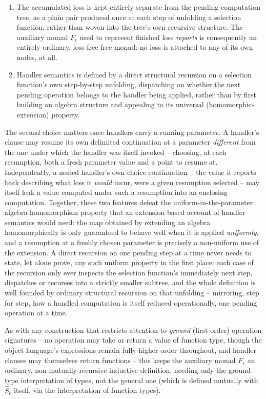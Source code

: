 \documentclass[11pt]{article}
\theoremstyle{plain}
\newcommand{\Fm}[1]{F_{#1}}
\newcommand{\Sm}[1]{\widehat{S}_{#1}}
\newcommand{\eps}{\epsilon}
\begin{document}
\begin{enumerate}
\item The accumulated loss is kept entirely separate from the pending-computation tree, as
  a plain pair produced once at each step of unfolding a selection function, rather than
  woven into the tree's own recursive structure. The auxiliary monad $\Fm\eps$ used to
  represent finished loss \emph{reports} is consequently an entirely ordinary, loss-free
  free monad: no loss is attached to any of its own nodes, at all.
\item Handler semantics is defined by a direct structural recursion on a selection
  function's own step-by-step unfolding, dispatching on whether the next pending operation
  belongs to the handler being applied, rather than by first building an algebra structure
  and appealing to its universal (homomorphic-extension) property.
\end{enumerate}

The second choice matters once handlers carry a running parameter. A handler's clause may
resume its own delimited continuation at a parameter \emph{different} from the one under
which the handler was itself invoked -- choosing, at each resumption, both a fresh
parameter value and a point to resume at. Independently, a nested handler's own choice
continuation -- the value it reports back describing what loss it \emph{would} incur, were
a given resumption selected -- may itself leak a value computed under such a resumption
into an enclosing computation. Together, these two features defeat the
uniform-in-the-parameter algebra-homomorphism property that an extension-based account of
handler semantics would need: the map obtained by extending an algebra homomorphically is
only guaranteed to behave well when it is applied \emph{uniformly}, and a resumption at a
freshly chosen parameter is precisely a non-uniform use of the extension. A direct
recursion on one pending step at a time never needs to state, let alone prove, any such
uniform property in the first place: each case of the recursion only ever inspects the
selection function's immediately next step, dispatches or recurses into a strictly smaller
subtree, and the whole definition is well founded by ordinary structural recursion on that
unfolding -- mirroring, step for step, how a handled computation is itself reduced
operationally, one pending operation at a time.

As with any construction that restricts attention to \emph{ground} (first-order) operation
signatures -- no operation may take or return a value of function type, though the object
language's expressions remain fully higher-order throughout, and handler clauses may
themselves return functions -- this keeps the auxiliary monad $\Fm\eps$ an ordinary,
non-mutually-recursive inductive definition, needing only the ground-type interpretation
of types, not the general one (which is defined mutually with $\Sm\eps$ itself, via the
interpretation of function types).
\end{document}
